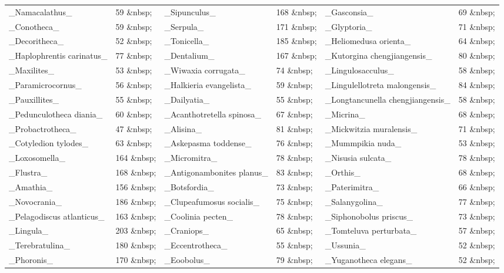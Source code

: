 \documentclass[openany]{book}
\theoremstyle{definition}
\theoremstyle{definition}
\theoremstyle{definition}
\theoremstyle{remark}
\begin{document}
\begin{tabular}{l|l|l|l|l|l}
\hline
 &  &  &  &  & \\
\hline
\_Namacalathus\_ & 59   \&nbsp; & \_Sipunculus\_ & 168   \&nbsp; & \_Gasconsia\_ & 69   \&nbsp;\\
\hline
\_Conotheca\_ & 59   \&nbsp; & \_Serpula\_ & 171   \&nbsp; & \_Glyptoria\_ & 71   \&nbsp;\\
\hline
\_Decoritheca\_ & 52   \&nbsp; & \_Tonicella\_ & 185   \&nbsp; & \_Heliomedusa orienta\_ & 64   \&nbsp;\\
\hline
\_Haplophrentis carinatus\_ & 77   \&nbsp; & \_Dentalium\_ & 167   \&nbsp; & \_Kutorgina chengjiangensis\_ & 80   \&nbsp;\\
\hline
\_Maxilites\_ & 53   \&nbsp; & \_Wiwaxia corrugata\_ & 74   \&nbsp; & \_Lingulosacculus\_ & 58   \&nbsp;\\
\hline
\_Paramicrocornus\_ & 56   \&nbsp; & \_Halkieria evangelista\_ & 59   \&nbsp; & \_Lingulellotreta malongensis\_ & 84   \&nbsp;\\
\hline
\_Pauxillites\_ & 55   \&nbsp; & \_Dailyatia\_ & 55   \&nbsp; & \_Longtancunella chengjiangensis\_ & 58   \&nbsp;\\
\hline
\_Pedunculotheca diania\_ & 60   \&nbsp; & \_Acanthotretella spinosa\_ & 67   \&nbsp; & \_Micrina\_ & 68   \&nbsp;\\
\hline
\_Probactrotheca\_ & 47   \&nbsp; & \_Alisina\_ & 81   \&nbsp; & \_Mickwitzia muralensis\_ & 71   \&nbsp;\\
\hline
\_Cotyledion tylodes\_ & 63   \&nbsp; & \_Askepasma toddense\_ & 76   \&nbsp; & \_Mummpikia nuda\_ & 53   \&nbsp;\\
\hline
\_Loxosomella\_ & 164   \&nbsp; & \_Micromitra\_ & 78   \&nbsp; & \_Nisusia sulcata\_ & 78   \&nbsp;\\
\hline
\_Flustra\_ & 168   \&nbsp; & \_Antigonambonites planus\_ & 83   \&nbsp; & \_Orthis\_ & 68   \&nbsp;\\
\hline
\_Amathia\_ & 156   \&nbsp; & \_Botsfordia\_ & 73   \&nbsp; & \_Paterimitra\_ & 66   \&nbsp;\\
\hline
\_Novocrania\_ & 186   \&nbsp; & \_Clupeafumosus socialis\_ & 75   \&nbsp; & \_Salanygolina\_ & 77   \&nbsp;\\
\hline
\_Pelagodiscus atlanticus\_ & 163   \&nbsp; & \_Coolinia pecten\_ & 78   \&nbsp; & \_Siphonobolus priscus\_ & 73   \&nbsp;\\
\hline
\_Lingula\_ & 203   \&nbsp; & \_Craniops\_ & 65   \&nbsp; & \_Tomteluva perturbata\_ & 57   \&nbsp;\\
\hline
\_Terebratulina\_ & 180   \&nbsp; & \_Eccentrotheca\_ & 55   \&nbsp; & \_Ussunia\_ & 52   \&nbsp;\\
\hline
\_Phoronis\_ & 170   \&nbsp; & \_Eoobolus\_ & 79   \&nbsp; & \_Yuganotheca elegans\_ & 52   \&nbsp;\\
\hline
\end{tabular}
\end{document}
